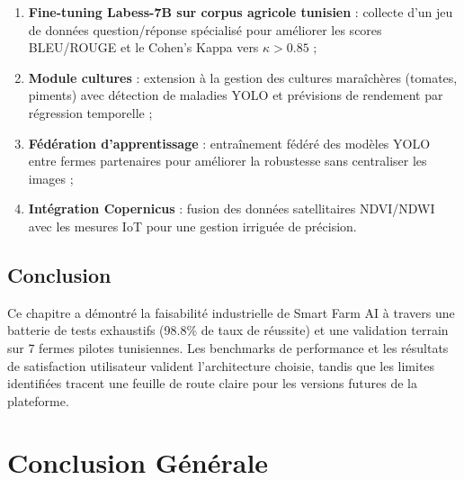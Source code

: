 \begin{enumerate}
  \item \textbf{Fine-tuning Labess-7B sur corpus agricole tunisien} :
        collecte d'un jeu de données question/réponse spécialisé pour
        améliorer les scores BLEU/ROUGE et le Cohen's Kappa vers $\kappa > 0.85$ ;
  \item \textbf{Module cultures} : extension à la gestion des cultures
        maraîchères (tomates, piments) avec détection de maladies YOLO et
        prévisions de rendement par régression temporelle ;
  \item \textbf{Fédération d'apprentissage} : entraînement fédéré des modèles
        YOLO entre fermes partenaires pour améliorer la robustesse sans
        centraliser les images ;
  \item \textbf{Intégration Copernicus} : fusion des données satellitaires
        NDVI/NDWI avec les mesures IoT pour une gestion irriguée de précision.
\end{enumerate}

\section*{Conclusion}
Ce chapitre a démontré la faisabilité industrielle de Smart Farm AI à travers
une batterie de tests exhaustifs (98.8\% de taux de réussite) et une validation
terrain sur 7 fermes pilotes tunisiennes. Les benchmarks de performance et
les résultats de satisfaction utilisateur valident l'architecture choisie,
tandis que les limites identifiées tracent une feuille de route claire pour
les versions futures de la plateforme.

\chapter*{Conclusion Générale}

